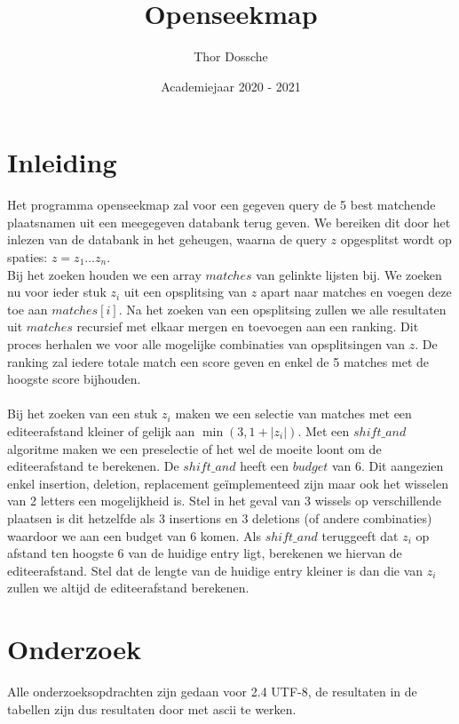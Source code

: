 \documentclass[11pt]{article}
\begin{document}
\begin{titlepage}
\title{Openseekmap}
\author{Thor Dossche}
\date{Academiejaar 2020 - 2021}
\maketitle
\thispagestyle{empty}
\end{titlepage}


\section{Inleiding}
Het programma openseekmap zal voor een gegeven query de 5 best matchende plaatsnamen uit een meegegeven databank terug geven. We bereiken dit door het inlezen van de databank in het geheugen, waarna de query $z$ opgesplitst wordt op spaties: $ z = z_1 \ldots z_n $. \\
Bij het zoeken houden we een array $matches$ van gelinkte lijsten bij. We zoeken nu voor ieder stuk $z_i$ uit een opsplitsing van $z$ apart naar matches en voegen deze toe aan $matches[i]$. Na het zoeken van een opsplitsing zullen we alle resultaten uit $matches$ recursief met elkaar mergen en toevoegen aan een ranking. Dit proces herhalen we voor alle mogelijke combinaties van opsplitsingen van $z$. De ranking zal iedere totale match een score geven en enkel de 5 matches met de hoogste score bijhouden.\\ 
\\
Bij het zoeken van een stuk $z_i$ maken we een selectie van matches met een editeerafstand kleiner of gelijk aan $\min(3,1+|z_i|)$. Met een $shift\_and$ algoritme maken we een preselectie of het wel de moeite loont om de editeerafstand te berekenen. De $shift\_and$ heeft een $budget$ van 6. Dit aangezien enkel insertion, deletion, replacement geïmplementeed zijn maar ook het wisselen van 2 letters een mogelijkheid is. Stel in het geval van 3 wissels op verschillende plaatsen is dit hetzelfde als 3 insertions en 3 deletions (of andere combinaties) waardoor we aan een budget van 6 komen. Als $shift\_and$ teruggeeft dat $z_i$ op afstand ten hoogste 6 van de huidige entry ligt, berekenen we hiervan de editeerafstand. Stel dat de lengte van de huidige entry kleiner is dan die van $z_i$ zullen we altijd de editeerafstand berekenen.

\section{Onderzoek}
Alle onderzoeksopdrachten zijn gedaan voor 2.4 UTF-8, de resultaten in de tabellen zijn dus resultaten door met ascii te werken.
\end{document}
